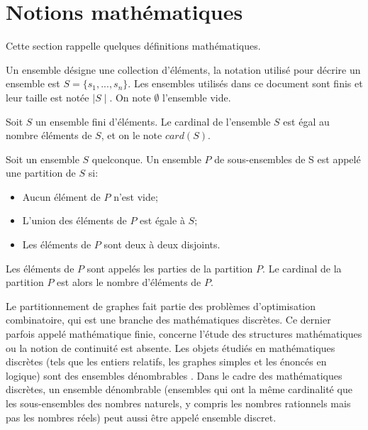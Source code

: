 
\section{Notions mathématiques}
Cette section rappelle quelques définitions mathématiques.
\begin{definition}[Ensemble]
Un ensemble désigne une collection d'éléments, la notation utilisé pour décrire un ensemble est $S =\{s_1, . . ., s_n\}$. Les ensembles utilisés dans ce document sont finis et leur taille est notée $\mid S \mid$. On note $\emptyset$ l'ensemble vide.
\end{definition}

\begin{definition}
Soit $S$ un ensemble fini d'éléments. Le cardinal de l'ensemble $S$ est égal au nombre éléments de $S$, et on le note $card(S)$.
\end{definition}

\begin{definition}[Partition]
Soit un ensemble $S$ quelconque. Un ensemble $P$ de sous-ensembles de S est appelé une partition de $S$ si:
\begin{itemize}
	\item Aucun élément de $P$ n'est vide;
	\item L'union des éléments de $P$ est égale à $S$;
	\item Les éléments de $P$ sont deux à deux disjoints.
\end{itemize}
 Les éléments de $P$ sont appelés les parties de la partition $P$. Le cardinal de la partition $P$ est alors le nombre d'éléments de $P$.
\end{definition}

Le partitionnement de graphes fait partie des problèmes d'optimisation combinatoire, qui est une branche des mathématiques discrètes. Ce dernier parfois appelé mathématique finie, concerne l'étude des structures mathématiques ou la notion de continuité est absente. Les objets étudiés en mathématiques discrètes (tels que les entiers relatifs, les graphes simples et les énoncés en logique) sont des ensembles dénombrables \citep{Norman1989}. Dans le cadre des mathématiques discrètes, un ensemble dénombrable (ensembles qui ont la même cardinalité que les sous-ensembles des nombres naturels, y compris les nombres rationnels mais pas les nombres réels) peut aussi être appelé ensemble discret.